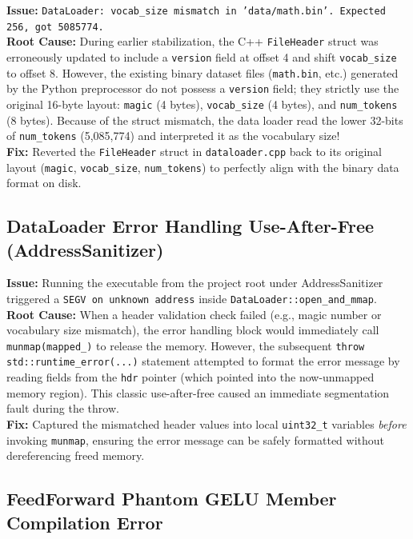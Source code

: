 \documentclass[12pt, a4paper]{article}
\begin{document}
\textbf{Issue:} \texttt{DataLoader: vocab\_size mismatch in 'data/math.bin'. Expected 256, got 5085774.} \\
\textbf{Root Cause:} During earlier stabilization, the C++ \texttt{FileHeader} struct was erroneously updated to include a \texttt{version} field at offset 4 and shift \texttt{vocab\_size} to offset 8. However, the existing binary dataset files (\texttt{math.bin}, etc.) generated by the Python preprocessor do not possess a \texttt{version} field; they strictly use the original 16-byte layout: \texttt{magic} (4 bytes), \texttt{vocab\_size} (4 bytes), and \texttt{num\_tokens} (8 bytes). Because of the struct mismatch, the data loader read the lower 32-bits of \texttt{num\_tokens} (5,085,774) and interpreted it as the vocabulary size! \\
\textbf{Fix:} Reverted the \texttt{FileHeader} struct in \texttt{dataloader.cpp} back to its original layout (\texttt{magic}, \texttt{vocab\_size}, \texttt{num\_tokens}) to perfectly align with the binary data format on disk.

\subsection{DataLoader Error Handling Use-After-Free (AddressSanitizer)}

\textbf{Issue:} Running the executable from the project root under AddressSanitizer triggered a \texttt{SEGV on unknown address} inside \texttt{DataLoader::open\_and\_mmap}. \\
\textbf{Root Cause:} When a header validation check failed (e.g., magic number or vocabulary size mismatch), the error handling block would immediately call \texttt{munmap(mapped\_)} to release the memory. However, the subsequent \texttt{throw std::runtime\_error(...)} statement attempted to format the error message by reading fields from the \texttt{hdr} pointer (which pointed into the now-unmapped memory region). This classic use-after-free caused an immediate segmentation fault during the throw. \\
\textbf{Fix:} Captured the mismatched header values into local \texttt{uint32\_t} variables \emph{before} invoking \texttt{munmap}, ensuring the error message can be safely formatted without dereferencing freed memory.

\subsection{FeedForward Phantom GELU Member Compilation Error}
\end{document}
